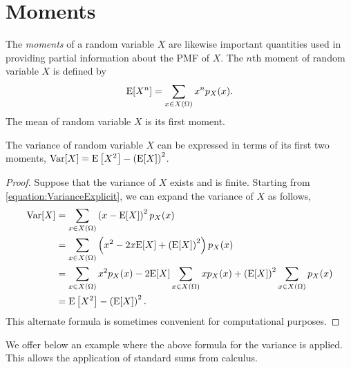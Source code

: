 \section{Moments}

The \emph{moments} of a random variable $X$ are likewise important quantities used in providing partial information about the PMF of $X$. 
The $n$th moment of random variable $X$ is defined by
\begin{equation} \label{equation:DiscreteMoments}
\mathrm{E} [X^n] = \sum_{x \in X(\Omega)} x^n p_X (x) .
\end{equation}
The mean of random variable $X$ is its first moment.

\begin{proposition}
The variance of random variable $X$ can be expressed in terms of its first two moments,
$\mathrm{Var} [X] = \mathrm{E} \left[ X^2 \right] - \left( \mathrm{E} [X] \right)^2$.
\end{proposition}
\begin{proof}
Suppose that the variance of $X$ exists and is finite.
Starting from \eqref{equation:VarianceExplicit}, we can expand the variance of $X$ as follows,
\begin{equation*}
\begin{split}
\mathrm{Var} [X] &= \sum_{x \in X(\Omega)} \left( x - \mathrm{E} [X] \right)^2 p_X (x) \\
&= \sum_{x \in X(\Omega)} \left( x^2 - 2 x \mathrm{E} [X] + \left( \mathrm{E} [X] \right)^2 \right) p_X (x) \\
&= \sum_{x \in X(\Omega)} x^2 p_X (x) - 2 \mathrm{E} [X] \sum_{x \in X(\Omega)} x p_X (x) + \left( \mathrm{E} [X] \right)^2 \sum_{x \in X(\Omega)} p_X (x) \\
&= \mathrm{E} \left[ X^2 \right] - \left( \mathrm{E} [X] \right)^2.
\end{split}
\end{equation*}
This alternate formula is sometimes convenient for computational purposes.
\end{proof}

We offer below an example where the above formula for the variance is applied.
This allows the application of standard sums from calculus.

